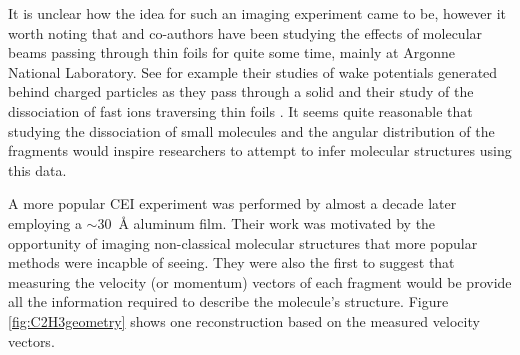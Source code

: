 
It is unclear how the idea for such an imaging experiment came to be, however it worth noting that \citet{Gaillard78} and co-authors have been studying the effects of molecular beams passing through thin foils for quite some time, mainly at Argonne National Laboratory. See for example their studies of wake potentials generated behind charged particles as they pass through a solid \citep{Gemmell75, Vager76PRL} and their study of the dissociation of fast  ions traversing thin foils \citep{Vager76PRA}. It seems quite reasonable that studying the dissociation of small molecules and the angular distribution of the fragments would inspire researchers to attempt to infer molecular structures using this data.

A more popular CEI experiment was performed by \citet{Vager89} almost a decade later employing a $\sim$\SI{30}{\angstrom} aluminum film. Their work was motivated by the opportunity of imaging non-classical molecular structures that more popular methods were incapble of seeing. They were also the first to suggest that measuring the velocity (or momentum) vectors of each fragment would be provide all the information required to describe the molecule's structure. Figure \ref{fig:C2H3geometry} shows one reconstruction based on the measured velocity vectors.

